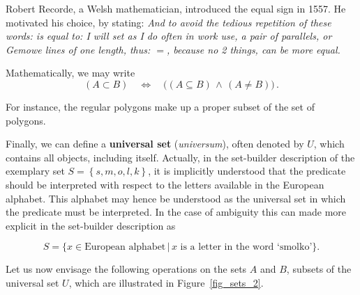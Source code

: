 \ifcourse

\begin{remark}[Equality]
	Robert Recorde, a Welsh mathematician, introduced the equal sign in 1557. He motivated his choice, by stating: 
	\textit{And to avoid the tedious repetition of these words: is equal to: I will set as I do often in work use, a pair of parallels, or Gemowe lines of one length, thus: $=$, because no 2 things, can be more equal.}	
\end{remark}
\fi

\ifcourse
\ifanalysis

	Mathematically, we may write
	$$
	\left(A\subset B\right) \quad\Leftrightarrow\quad  \big(\left(A\subseteq B\right) \, \land \, \left(A\neq B\right)\big)\,.
	$$

\fi
\fi

For instance, the regular polygons make up a proper subset of the set of polygons. %


Finally, we can define a \textbf{universal set} (\textit{universum}), often denoted by $U$, which contains all objects, including itself.
Actually, in the set-builder description of the exemplary set $S=\left\{ s, m, o, l, k \right\}$, it is implicitly understood that the predicate should be interpreted with respect to the letters available in the European alphabet.  This alphabet may hence be understood as the universal set in which the predicate must be interpreted. In the case of ambiguity this can made more explicit in the set-builder description as

\[ S=\{ x \in \mbox{European alphabet}\, | \, \mbox{$x$ is a letter in the word `smolko'}\}. \]


Let us now envisage the following operations on the sets $A$ and $B$, subsets of the universal set $U$, which are illustrated in Figure~\ref{fig_sets_2}.


